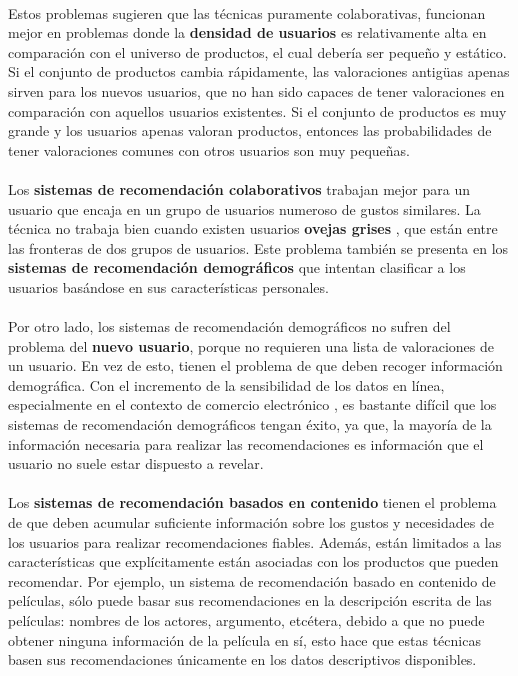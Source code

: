 \documentclass[12pt,letterpaper,oneside] {memoir}
\begin{document}
\paragraph{}
Estos problemas sugieren que las técnicas puramente colaborativas, funcionan mejor en problemas donde la \textbf{densidad de usuarios} es relativamente alta en comparación con el universo de productos, el cual debería ser pequeño y estático. Si el conjunto de productos cambia rápidamente, las valoraciones antigüas apenas sirven para los nuevos usuarios, que no han sido capaces de tener valoraciones en comparación con aquellos usuarios existentes. Si el conjunto de productos es muy grande y los usuarios apenas valoran productos, entonces las probabilidades de tener valoraciones comunes con otros usuarios son muy pequeñas.
\paragraph{}
Los \textbf{sistemas de recomendación colaborativos} trabajan mejor para un usuario que encaja en un grupo de usuarios numeroso de gustos similares. La técnica no trabaja bien cuando existen usuarios \textbf{ovejas grises} \citep{Claypool1999}, que están entre las fronteras de dos grupos de usuarios. Este problema también se presenta en los \textbf{sistemas de recomendación demográficos} que intentan clasificar a los usuarios basándose en sus características personales. 
\paragraph{}
Por otro lado, los sistemas de recomendación demográficos no sufren del problema del \textbf{nuevo usuario}, porque no requieren una lista de valoraciones de un usuario. En vez de esto, tienen el problema de que deben recoger información demográfica. Con el incremento de la sensibilidad de los datos en línea, especialmente en el contexto de comercio electrónico \citep{Information1997}, es bastante difícil que los sistemas de recomendación demográficos tengan éxito, ya que, la mayoría de la información necesaria para realizar las recomendaciones es información que el usuario no suele estar dispuesto a revelar.
\paragraph{}
Los \textbf{sistemas de recomendación basados en contenido} tienen el problema de que deben acumular suficiente información sobre los gustos y necesidades de los usuarios para realizar recomendaciones fiables. Además, están limitados a las características que explícitamente están asociadas con los productos que pueden recomendar. Por ejemplo, un sistema de recomendación basado en contenido de películas, sólo puede basar sus recomendaciones en la descripción escrita de las películas: nombres de los actores, argumento, etcétera,  debido a que no puede obtener ninguna información de la película en sí, esto hace que estas técnicas basen sus recomendaciones únicamente en los datos descriptivos disponibles.
\end{document}
